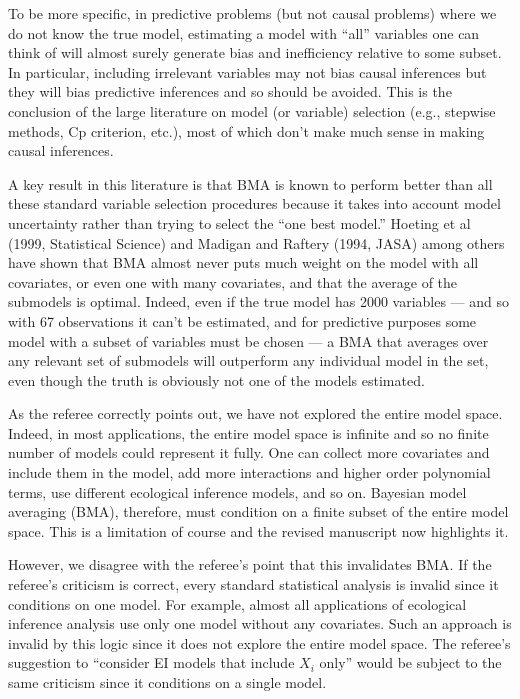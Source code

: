 \documentclass[11pt]{article}
\begin{document}
\begin{enumerate}
  To be more specific, in predictive problems (but not causal
  problems) where we do not know the true model, estimating a model
  with ``all'' variables one can think of will almost surely generate
  bias and inefficiency relative to some subset.  In particular,
  including irrelevant variables may not bias causal inferences but
  they will bias predictive inferences and so should be avoided.  This
  is the conclusion of the large literature on model (or variable)
  selection (e.g., stepwise methods, Cp criterion, etc.), most of
  which don't make much sense in making causal inferences.
  
  A key result in this literature is that BMA is known to perform
  better than all these standard variable selection procedures because
  it takes into account model uncertainty rather than trying to select
  the ``one best model.''  Hoeting et al (1999, Statistical Science)
  and Madigan and Raftery (1994, JASA) among others have shown that
  BMA almost never puts much weight on the model with all covariates,
  or even one with many covariates, and that the average of the
  submodels is optimal.  Indeed, even if the true model has 2000
  variables --- and so with 67 observations it can't be estimated, and
  for predictive purposes some model with a subset of variables must
  be chosen --- a BMA that averages over any relevant set of submodels
  will outperform any individual model in the set, even though the
  truth is obviously not one of the models estimated.
  
  As the referee correctly points out, we have not explored the entire
  model space. Indeed, in most applications, the entire model space is
  infinite and so no finite number of models could represent it fully.
  One can collect more covariates and include them in the model, add
  more interactions and higher order polynomial terms, use different
  ecological inference models, and so on.  Bayesian model averaging
  (BMA), therefore, must condition on a finite subset of the entire
  model space.  This is a limitation of course and the revised
  manuscript now highlights it.
  
  However, we disagree with the referee's point that this invalidates
  BMA. If the referee's criticism is correct, every standard
  statistical analysis is invalid since it conditions on one model.
  For example, almost all applications of ecological inference
  analysis use only one model without any covariates. Such an approach
  is invalid by this logic since it does not explore the entire model
  space.  The referee's suggestion to ``consider EI models that
  include $X_i$ only'' would be subject to the same criticism since it
  conditions on a single model.
  

\end{enumerate}
\end{document}
